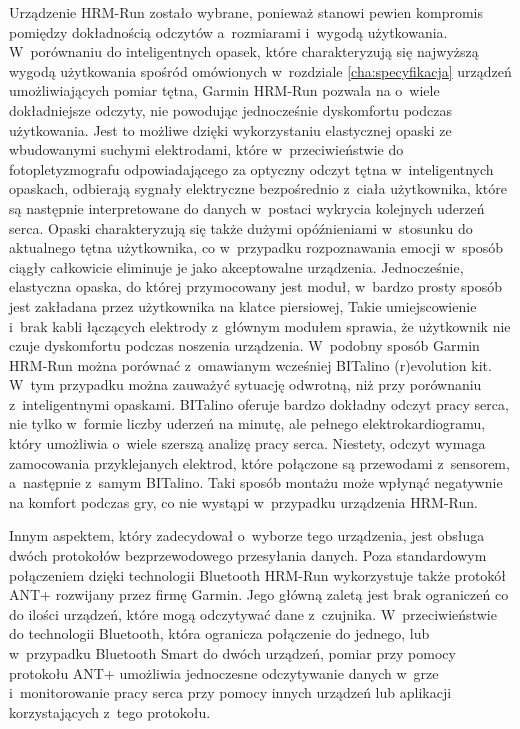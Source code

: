 Urządzenie HRM-Run zostało wybrane, ponieważ stanowi pewien kompromis pomiędzy dokładnością odczytów a~rozmiarami i~wygodą użytkowania. W~porównaniu do inteligentnych opasek, które charakteryzują się najwyższą wygodą użytkowania spośród omówionych w~rozdziale \ref{cha:specyfikacja} urządzeń umożliwiających pomiar tętna, Garmin HRM-Run pozwala na o~wiele dokładniejsze odczyty, nie powodując jednocześnie dyskomfortu podczas użytkowania. Jest to możliwe dzięki wykorzystaniu elastycznej opaski ze wbudowanymi suchymi elektrodami, które w~przeciwieństwie do fotopletyzmografu odpowiadającego za optyczny odczyt tętna w~inteligentnych opaskach, odbierają sygnały elektryczne bezpośrednio z~ciała użytkownika, które są następnie interpretowane do danych w~postaci wykrycia kolejnych uderzeń serca. Opaski charakteryzują się także dużymi opóźnieniami w~stosunku do aktualnego tętna użytkownika, co w~przypadku rozpoznawania emocji w~sposób ciągły całkowicie eliminuje je jako akceptowalne urządzenia. Jednocześnie, elastyczna opaska, do której przymocowany jest moduł, w~bardzo prosty sposób jest zakładana przez użytkownika na klatce piersiowej, Takie umiejscowienie i~brak kabli łączących elektrody z~głównym modułem sprawia, że użytkownik nie czuje dyskomfortu podczas noszenia urządzenia. W~podobny sposób Garmin HRM-Run można porównać z~omawianym wcześniej BITalino (r)evolution kit. W~tym przypadku można zauważyć sytuację odwrotną, niż przy porównaniu z~inteligentnymi opaskami. BITalino oferuje bardzo dokładny odczyt pracy serca, nie tylko w~formie liczby uderzeń na minutę, ale pełnego elektrokardiogramu, który umożliwia o~wiele szerszą analizę pracy serca. Niestety, odczyt wymaga zamocowania przyklejanych elektrod, które połączone są przewodami z~sensorem, a~następnie z~samym BITalino. Taki sposób montażu może wpłynąć negatywnie na komfort podczas gry, co nie wystąpi w~przypadku urządzenia HRM-Run.

Innym aspektem, który zadecydował o~wyborze tego urządzenia, jest obsługa dwóch protokołów bezprzewodowego przesyłania danych. Poza standardowym połączeniem dzięki technologii Bluetooth HRM-Run wykorzystuje także protokół ANT+ rozwijany przez firmę Garmin. Jego główną zaletą jest brak ograniczeń co do ilości urządzeń, które mogą odczytywać dane z~czujnika. W~przeciwieństwie do technologii Bluetooth, która ogranicza połączenie do jednego, lub w~przypadku Bluetooth Smart do dwóch urządzeń, pomiar przy pomocy protokołu ANT+ umożliwia jednoczesne odczytywanie danych w~grze i~monitorowanie pracy serca przy pomocy innych urządzeń lub aplikacji korzystających z~tego protokołu. 

